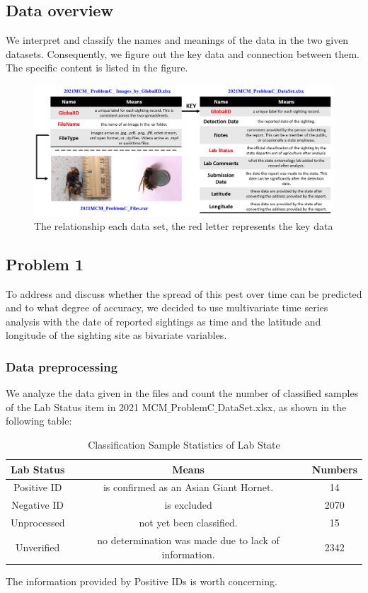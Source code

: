 \documentclass{mcmthesis}
\begin{document}
\subsection{Data overview}
We interpret and classify the names and meanings of the data in the two given datasets. Consequently, we figure out the key data and connection between them. The specific content is listed in the figure.

\begin{figure}[H]
	\centering
	\includegraphics[width=\textwidth]{screenshot010}
	\caption{The relationship each data set, the red letter represents the key data}
	\label{fig:screenshot010}
\end{figure}


\subsection{Problem 1}
To address and discuss whether the spread of this pest over time can be predicted and to what degree of accuracy, we decided to use multivariate time series analysis with the date of reported sightings as time and the latitude and longitude of the sighting site as bivariate variables.

\hspace*{\fill}
\subsubsection{Data preprocessing}
We analyze the data given in the files and count the number of classified samples of the Lab Status item in 2021 MCM$ \_ $ProblemC$ \_ $DataSet.xlsx, as shown in the following table:

\begin{table}[!htbp]   %
	\centering\caption{Classification Sample Statistics of Lab State }
	\begin{tabular}{ccc}
		\toprule[1.5pt]
	Lab Status&	Means&	Numbers\\
		\midrule[1pt]
Positive ID	&is confirmed as an Asian Giant Hornet.&	14\\
Negative ID &	is excluded	&2070\\
Unprocessed &	 not yet been classified.&	15\\
Unverified	&no determination was made due to lack of information.&	2342\\
		\bottomrule[1.5pt]
	\end{tabular}
\end{table}
The information provided by Positive IDs is worth concerning. 
\end{document}

